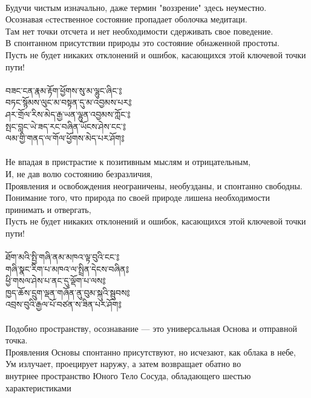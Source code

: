 \\
\ru
Будучи чистым изначально, даже термин "воззрение" здесь неуместно.\\
Осознавая eстественное состояние пропадает оболочка медитаци.\\
Там нет точки отсчета и нет необходимости сдерживать свое поведение.\\
В спонтанном присутствии природы это состояние обнаженной простоты.\\
Пусть не будет никаких отклонений и ошибок, касающихся этой ключевой точки пути!\\
\\
\newpage
\ti བཟང་ངན་རྣམ་རྟོག་ཕྱོགས་སུ་མ་ལྷུང་ཞིང༌༔\\
བཏང་སྙོམས་ལུང་མ་བསྟན་དུ་མ་འབྱམས་པར༔\\
ཤར་གྲོལ་རིས་མེད་རྒྱ་ཡན་ལྷུན་འབྱམས་ཀློང༌༔\\
སྤང་བླང་ཡེ་ཟད་རང་བཞིན་ཡོངས་ཤེས་ངང༌༔\\
ལམ་གྱི་གནད་ལ་གོལ་ཕྱོགས་མེད་པར་ཤོག༔\\
\\
\ru
Не впадая в пристрастие к позитивным мыслям и отрицательным,\\
И, не дав волю состоянию безразличия,\\
Проявления и освобождения неограничены, необузданы, и спонтанно свободны.\\
Понимание того, что природа по своей природе лишена необходимости принимать и отвергать,\\
Пусть не будет никаких отклонений и ошибок, касающихся этой ключевой точки пути!\\
\\
\ti ཐོག་མའི་སྤྱི་གཞི་ནམ་མཁའ་ལྟ་བུའི་ངང༌༔\\
གཞི་སྣང་རིག་པ་མཁའ་ལ་སྤྲིན་དེངས་བཞིན༔\\
ཕྱི་གསལ་ཤེས་པ་ནང་དུ་ལྡོག་པ་ལས༔\\
ཁྱད་ཆོས་དྲུག་ལྡན་གཞོན་ནུ་བུམ་སྐུའི་སྦུབས༔\\
འབྲས་བུའི་རྒྱལ་པོ་བཙན་ས་ཟིན་པར་ཤོག༔\\
\\
\ru
Подобно пространству, осознавание — это универсальная Основа и отправной точка.\\
Проявления Основы спонтанно присутствуют, но исчезают, как облака в небе,\\
Ум излучает, проецирует наружу, а затем возвращает обатно во\\
внутрнее пространство Юного Тело Сосуда, обладающего шестью характеристиками\\
